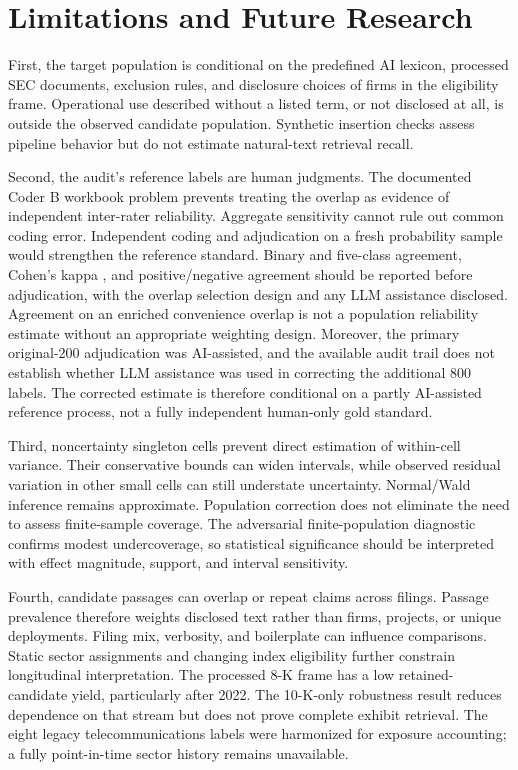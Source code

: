 \documentclass[12pt]{article}
\begin{document}
\section{Limitations and Future Research}

First, the target population is conditional on the predefined AI lexicon,
processed SEC documents, exclusion rules, and disclosure choices of firms in
the eligibility frame. Operational use described without a listed term, or not
disclosed at all, is outside the observed candidate population. Synthetic
insertion checks assess pipeline behavior but do not estimate natural-text
retrieval recall.

Second, the audit's reference labels are human judgments. The documented Coder B
workbook problem prevents treating the overlap as evidence of independent
inter-rater reliability. Aggregate sensitivity cannot rule out common coding
error. Independent coding and adjudication on a fresh probability sample would
strengthen the reference standard. Binary and five-class agreement, Cohen's
kappa \citep{cohen1960agreement}, and positive/negative agreement should be
reported before adjudication, with the overlap selection design and any LLM
assistance disclosed. Agreement on an enriched convenience overlap is not a
population reliability estimate without an appropriate weighting design.
Moreover, the primary original-200 adjudication was AI-assisted, and the
available audit trail does not establish whether LLM assistance was used in
correcting the additional 800 labels. The corrected estimate is therefore
conditional on a partly AI-assisted reference process, not a fully independent
human-only gold standard.

Third, noncertainty singleton cells prevent direct estimation of within-cell
variance. Their conservative bounds can widen intervals, while observed
residual variation in other small cells can still understate uncertainty.
Normal/Wald inference remains approximate. Population
correction does not eliminate the need to assess finite-sample coverage.
The adversarial finite-population diagnostic confirms modest undercoverage,
so statistical significance should be interpreted with effect magnitude,
support, and interval sensitivity.

Fourth, candidate passages can overlap or repeat claims across filings.
Passage prevalence therefore weights disclosed text rather than firms,
projects, or unique deployments. Filing mix, verbosity, and boilerplate can
influence comparisons. Static sector assignments and changing index
eligibility further constrain longitudinal interpretation.
The processed 8-K frame has a low retained-candidate yield, particularly after
2022. The 10-K-only robustness result reduces dependence on that stream but
does not prove complete exhibit retrieval. The eight legacy
telecommunications labels were harmonized for exposure accounting; a fully
point-in-time sector history remains unavailable.
\end{document}
